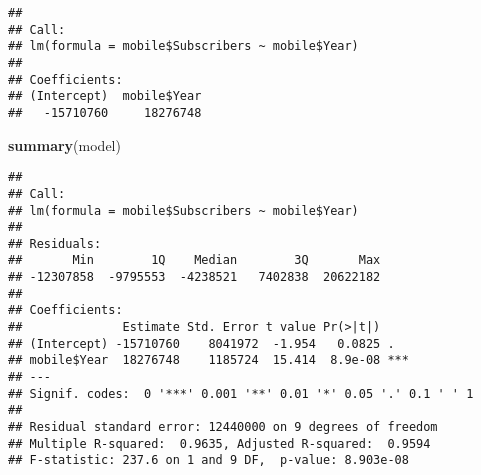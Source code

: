 \documentclass[]{article}
\newenvironment{Shaded}{\begin{snugshade}}{\end{snugshade}}
\newcommand{\KeywordTok}[1]{\textcolor[rgb]{0.13,0.29,0.53}{\textbf{#1}}}
\newcommand{\DecValTok}[1]{\textcolor[rgb]{0.00,0.00,0.81}{#1}}
\newcommand{\StringTok}[1]{\textcolor[rgb]{0.31,0.60,0.02}{#1}}
\newcommand{\CommentTok}[1]{\textcolor[rgb]{0.56,0.35,0.01}{\textit{#1}}}
\newcommand{\ControlFlowTok}[1]{\textcolor[rgb]{0.13,0.29,0.53}{\textbf{#1}}}
\newcommand{\OperatorTok}[1]{\textcolor[rgb]{0.81,0.36,0.00}{\textbf{#1}}}
\newcommand{\NormalTok}[1]{#1}
\begin{document}
\begin{verbatim}
## 
## Call:
## lm(formula = mobile$Subscribers ~ mobile$Year)
## 
## Coefficients:
## (Intercept)  mobile$Year  
##   -15710760     18276748
\end{verbatim}

\begin{Shaded}
\begin{Highlighting}[]
\KeywordTok{summary}\NormalTok{(model)}
\end{Highlighting}
\end{Shaded}

\begin{verbatim}
## 
## Call:
## lm(formula = mobile$Subscribers ~ mobile$Year)
## 
## Residuals:
##       Min        1Q    Median        3Q       Max 
## -12307858  -9795553  -4238521   7402838  20622182 
## 
## Coefficients:
##              Estimate Std. Error t value Pr(>|t|)    
## (Intercept) -15710760    8041972  -1.954   0.0825 .  
## mobile$Year  18276748    1185724  15.414  8.9e-08 ***
## ---
## Signif. codes:  0 '***' 0.001 '**' 0.01 '*' 0.05 '.' 0.1 ' ' 1
## 
## Residual standard error: 12440000 on 9 degrees of freedom
## Multiple R-squared:  0.9635, Adjusted R-squared:  0.9594 
## F-statistic: 237.6 on 1 and 9 DF,  p-value: 8.903e-08
\end{verbatim}

\begin{Shaded}
\end{Shaded}
\end{document}
